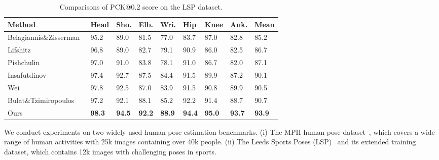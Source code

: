 \documentclass[10pt,twocolumn,letterpaper]{article}
\begin{document}
\begin{table} %
	\begin{footnotesize}
		\centering
		\caption{   Comparisons of PCK@0.2 score on the LSP dataset.}
		\begin{tabular}{@{}p{2.7cm}p{0.3cm}p{0.3cm}p{0.3cm}p{0.3cm}p{0.3cm}p{0.3cm}p{0.3cm}p{0.4cm}}
			\hline
			Method & Head & Sho. & Elb. & Wri. & Hip & Knee & Ank. & Mean \\
			\hline 
			Belagiannis\&Zisserman~\cite{belagiannis2016recurrent} & 95.2 & 89.0 & 81.5 & 77.0 & 83.7 & 87.0 & 82.8 & 85.2 \\
			Lifshitz \etal~\cite{lifshitz2016human} & 96.8 & 89.0 & 82.7 & 79.1 & 90.9 & 86.0 & 82.5 & 86.7 \\
			Pishchulin \etal~\cite{pishchulin2016deepcut} & 97.0 & 91.0 & 83.8 & 78.1 & 91.0 & 86.7 & 82.0 & 87.1 \\
			Insafutdinov \etal~\cite{insafutdinov2016deepercut} & 97.4 & 92.7 & 87.5 & 84.4 & 91.5 & 89.9 & 87.2 & 90.1 \\
			Wei \etal~\cite{wei2016convolutional} & 97.8 & 92.5 & 87.0 & 83.9 & 91.5 & 90.8 & 89.9 & 90.5 \\
			Bulat\&Tzimiropoulos~\cite{bulat2016human} & 97.2 & 92.1 & 88.1 & 85.2 & 92.2 & 91.4 & 88.7 & 90.7 \\
			\hline
			Ours & \textbf{98.3}& \textbf{94.5} & \textbf{92.2} & \textbf{88.9} & \textbf{94.4} & \textbf{95.0} & \textbf{93.7} & \textbf{93.9} \\
			\hline      
		\end{tabular}
		\label{tab:LSP}
	\end{footnotesize}
\vspace{-1em}
\end{table}
We conduct experiments on two widely used human pose estimation benchmarks.
(i) The MPII human pose dataset~\cite{andriluka20142d}, which covers a wide range of human activities with 25k images containing over 40k people. 
(ii) The Leeds Sports Poses (LSP)~\cite{Johnson10} and its extended training dataset, which contains 12k images with challenging poses in sports. 
\end{document}
